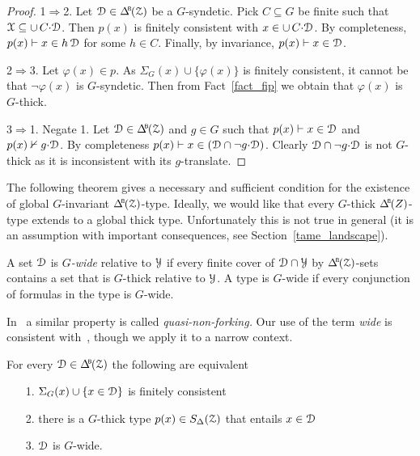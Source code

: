 \begin{proof}
  1$\Rightarrow$2.
  Let $\D\in\BDelta(\Z)$ be a $G$-syndetic.
  Pick $C\subseteq G$ be finite such that $\EuScript X\subseteq\cup\,C{\cdot}\EuScript D$.
  Then $p(x)$ is finitely consistent with $x\in\cup\,C{\cdot}\EuScript D$.
  By completeness, $p(x)\vdash x\in h\,\EuScript D$ for some $h\in C$.
  Finally, by invariance, $p(x)\vdash x\in\EuScript D$.
  
  2$\Rightarrow$3.
  Let $\varphi(x)\in p$.
  As $\Sigma_G(x)\cup\{\varphi(x)\}$ is finitely consistent, it cannot be that $\neg\varphi(x)$ is $G$-syndetic.
  Then from Fact~\ref{fact_fip} we obtain that $\varphi(x)$ is $G$-thick.

  3$\Rightarrow$1.
  Negate 1.
  Let $\D\in\BDelta(\Z)$ and $g\in G$ such that $p(x)\vdash x\in\EuScript D$ and $p(x)\nvdash g{\cdot}\EuScript D$.
  By completeness $p(x)\vdash x\in(\EuScript D\cap\neg g{\cdot}\EuScript D)$.
  Clearly $\EuScript D\cap \neg g{\cdot}\EuScript D$ is not $G$-thick as it is inconsistent with its $g$-translate.
\end{proof}


The following theorem gives a necessary and sufficient condition for the  existence of global $G$-invariant $\BDelta(\Z)$-type.
Ideally, we would like that every $G$-thick $\BDelta(Z)$-type extends to a global thick type.
Unfortunately this is not true in general (it is an assumption with important consequences, see Section~\ref{tame_landscape}).

A set $\EuScript D$ is \emph{$G$-wide\/} relative to $\EuScript Y$ if every finite cover of $\EuScript D\cap\EuScript Y$ by $\BDelta(\Z)$-sets contains a set that is $G$-thick relative to $\EuScript Y$.
A type is $G$-wide if every conjunction of formulas in the type is $G$-wide.

In~\cite{CK} a similar property is called \textit{quasi-non-forking.}
Our use of the term \textit{wide\/} is consistent with~\cite{Hr}, though we apply it to a narrow context.

\begin{theorem}\label{thm_syndetic_invariant2}
  For every $\D\in\BDelta(\Z)$ the following are equivalent 
  \begin{itemize}
    \item[1.] $\Sigma_G(x)\cup\{x\in\EuScript D\}$ is finitely consistent
    \item[2.] there is a $G$-thick type $p(x)\in S_\Delta(\EuScript Z)$ that entails $x\in\EuScript D$
    \item[3.] $\EuScript D$ is $G$-wide.\smallskip
  \end{itemize}
\end{theorem}


